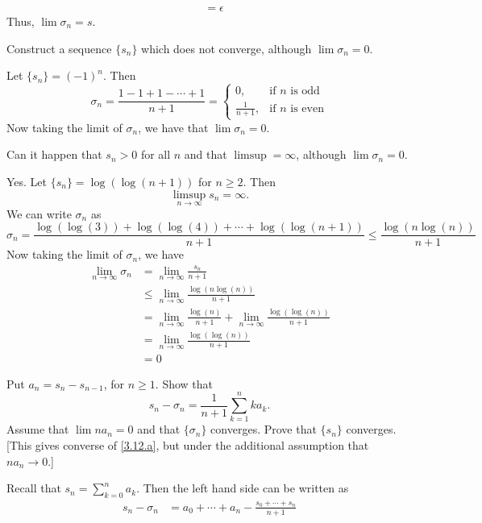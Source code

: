 \begin{exercise}
\begin{exercise}[label = (\alph*), ref = \arabic{exercisei} (\alph*)]
\begin{align*}
      & = \epsilon
    \end{align*}
    Thus, \(\lim\sigma_n = s\).
  \item
    Construct a sequence \(\{s_n\}\) which does not converge, although
    \(\lim\sigma_n = 0\).
    \par\smallskip
    Let \(\{s_n\} = (-1)^n\).
    Then
    \[
    \sigma_n = \frac{1 - 1 + 1 - \cdots + 1}{n + 1} =
    \begin{cases}
      0, & \text{if \(n\) is odd}\\
      \frac{1}{n + 1}, & \text{if \(n\) is even}
    \end{cases}
    \]
    Now taking the limit of \(\sigma_n\), we have that \(\lim\sigma_n = 0\).
  \item
    Can it happen that \(s_n > 0\) for all \(n\) and that \(\limsup = \infty\),
    although \(\lim\sigma_n = 0\).
    \par\smallskip
    Yes.
    Let \(\{s_n\} = \log(\log(n + 1))\) for \(n\geq 2\).
    Then
    \[
    \limsup_{n\to\infty} s_n = \infty.
    \]
    We can write \(\sigma_n\) as
    \[
    \sigma_n = \frac{\log(\log(3)) + \log(\log(4)) + \cdots +
      \log(\log(n + 1))}{n + 1}\leq\frac{\log(n\log(n))}{n + 1}
    \]
    Now taking the limit of \(\sigma_n\), we have
    \begin{align*}
      \lim_{n\to\infty}\sigma_n
      & = \lim_{n\to\infty}\frac{s_n}{n + 1}\\
      & \leq \lim_{n\to\infty}\frac{\log(n\log(n))}{n + 1}\\
      & = \lim_{n\to\infty}\frac{\log(n)}{n + 1} +
        \lim_{n\to\infty}\frac{\log(\log(n))}{n + 1}\\
      & = \lim_{n\to\infty}\frac{\log(\log(n))}{n + 1}\\
      & = 0
    \end{align*}
  \item
    Put \(a_n = s_n - s_{n - 1}\), for \(n\geq 1\).
    Show that
    \[
    s_n - \sigma_n = \frac{1}{n + 1}\sum_{k = 1}^nka_k.
    \]
    Assume that \(\lim na_n = 0\) and that \(\{\sigma_n\}\) converges.
    Prove that \(\{s_n\}\) converges.
    [This gives converse of \cref{3.12.a}, but under the additional assumption
    that \(na_n\to 0\).]
    \par\smallskip
    Recall that \(s_n = \sum_{k = 0}^na_k\).
    Then the left hand side can be written as
    \begin{align*}
      s_n - \sigma_n & = a_0 + \cdots + a_n -
                       \frac{s_0 + \cdots + s_n}{n + 1}\\

\end{align*}
\end{exercise}
\end{exercise}
